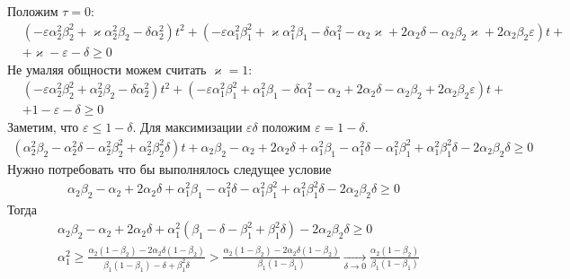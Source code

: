 \documentclass[a4paper,14pt]{extarticle} %
\begin{document}
Положим $\tau = 0$:
 \begin{equation}
 \begin{aligned}
&(-\varepsilon\alpha_2^2\beta_2^2 + \varkappa\alpha_2^2\beta_2 - \delta\alpha_2^2)t^2 + (-\varepsilon\alpha_1^2\beta_1^2 + \varkappa\alpha_1^2\beta_1 - \delta\alpha_1^2 - \alpha_2\varkappa + 2\alpha_2\delta - \alpha_2\beta_2\varkappa + 2\alpha_2\beta_2\varepsilon)t +\\
& + \varkappa - \varepsilon - \delta \geq 0
 \end{aligned}
\end{equation}
Не умаляя общности можем считать $\varkappa = 1$:
 \begin{equation}
 \begin{aligned}
&(-\varepsilon\alpha_2^2\beta_2^2 + \alpha_2^2\beta_2 - \delta\alpha_2^2)t^2 + (-\varepsilon\alpha_1^2\beta_1^2 + \alpha_1^2\beta_1 - \delta\alpha_1^2 - \alpha_2 + 2\alpha_2\delta - \alpha_2\beta_2 + 2\alpha_2\beta_2\varepsilon)t +\\
& + 1 - \varepsilon - \delta \geq 0
 \end{aligned}
\end{equation}
Заметим, что $\varepsilon \leq 1 - \delta$. Для максимизации $\varepsilon\delta$ положим $\varepsilon = 1-\delta$.
 \begin{equation}
 \begin{aligned}
(\alpha_2^2\beta_2 - \alpha_2^2\delta - \alpha_2^2\beta_2^2 + \alpha_2^2\beta_2^2\delta)t + \alpha_2\beta_2 - \alpha_2 + 2\alpha_2\delta + \alpha_1^2\beta_1 - \alpha_1^2\delta - \alpha_1^2\beta_1^2 + \alpha_1^2\beta_1^2\delta - 2\alpha_2\beta_2\delta \geq 0
 \end{aligned}
\end{equation}
Нужно потребовать что бы выполнялось следущее условие
 \begin{equation}
 \begin{aligned}
\alpha_2\beta_2 - \alpha_2 + 2\alpha_2\delta + \alpha_1^2\beta_1 - \alpha_1^2\delta - \alpha_1^2\beta_1^2 + \alpha_1^2\beta_1^2\delta - 2\alpha_2\beta_2\delta \geq 0
 \end{aligned}
\end{equation}
Тогда
 \begin{equation}
 \begin{aligned}
&\alpha_2\beta_2 - \alpha_2 + 2\alpha_2\delta + \alpha_1^2(\beta_1 - \delta - \beta_1^2 + \beta_1^2\delta) - 2\alpha_2\beta_2\delta \geq 0 \\
&\alpha_1^2 \geq \frac{\alpha_2(1-\beta_2) - 2\alpha_2\delta(1-\beta_2)}{\beta_1(1-\beta_1) - \delta + \beta_1^2\delta} > \frac{\alpha_2(1-\beta_2) - 2\alpha_2\delta(1-\beta_2)}{\beta_1(1-\beta_1)} \xrightarrow[\delta \rightarrow 0]{} \frac{\alpha_2(1-\beta_2)}{\beta_1(1-\beta_1)}
 \end{aligned}
\end{equation}
\end{document}
